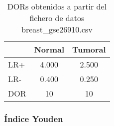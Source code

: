 \bigbreak

\begin{table}
    \centering
    \begin{tabular}{lcc}
            & \hspace{20pt}Normal\hspace{20pt}  & Tumoral   \\\hline
        LR+ & 4.000                             & 2.500     \\\hline
        LR- & 0.400                             & 0.250     \\\hline
        DOR & 10                                & 10        \\\hline
    \end{tabular}
    \caption{DORs obtenidos a partir del fichero de datos breast\_gse26910.csv}
    \label{tab:4}
\end{table}



\subsubsection{Índice Youden}

